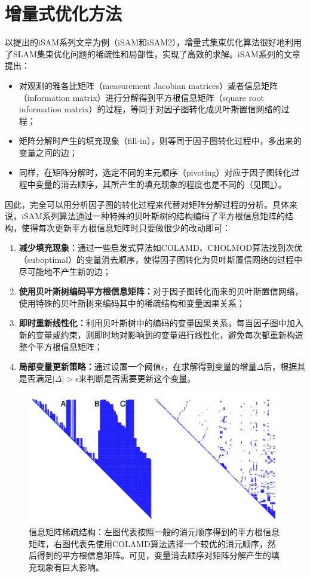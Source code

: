 \section{增量式优化方法}

以\citeauthor{kaess2008isam}提出的iSAM系列文章为例（iSAM\citep{kaess2008isam}和iSAM2\citep{kaess2012isam2}），增量式集束优化算法很好地利用了SLAM集束优化问题的稀疏性和局部性，实现了高效的求解。iSAM系列的文章提出：
\begin{itemize}
    \item 对观测的雅各比矩阵（measurement Jacobian matrices）或者信息矩阵（information matrix）进行分解得到平方根信息矩阵（square root information matrix）的过程，等同于对因子图转化成贝叶斯置信网络的过程；
    \item 矩阵分解时产生的填充现象（fill-in），则等同于因子图转化过程中，多出来的变量之间的边；
    \item 同样，在矩阵分解时，选定不同的主元顺序（pivoting）对应于因子图转化过程中变量的消去顺序，其所产生的填充现象的程度也是不同的（见图\ref{fig:fill_in}）。
\end{itemize}

因此，完全可以用分析因子图的转化过程来代替对矩阵分解过程的分析。具体来说，iSAM系列算法通过一种特殊的贝叶斯树的结构编码了平方根信息矩阵的结构，使得每次更新平方根信息矩阵时只要做很少的改动即可：
\begin{enumerate}
    \item \textbf{减少填充现象：}通过一些启发式算法如COLAMD\citep{davis2004algorithm}、CHOLMOD\citep{chen2008algorithm}算法找到次优（suboptimal）的变量消去顺序，使得因子图转化为贝叶斯置信网络的过程中尽可能地不产生新的边；
    \item \textbf{使用贝叶斯树编码平方根信息矩阵：}对于因子图转化而来的贝叶斯置信网络，使用特殊的贝叶斯树来编码其中的稀疏结构和变量因果关系；
    \item \textbf{即时重新线性化：}利用贝叶斯树中的编码的变量因果关系，每当因子图中加入新的变量或约束，则即时地对影响到的变量进行线性化，避免每次都重新构造整个平方根信息矩阵；
    \item \textbf{局部变量更新策略：}通过设置一个阈值$\epsilon$，在求解得到变量的增量$\Delta$后，根据其是否满足$|\Delta|>\epsilon$来判断是否需要更新这个变量。
\end{enumerate}

\begin{figure}[htb!]
    \centering
    \includegraphics[width=.8\textwidth]{./figs/sparse_pattern.png}
    \caption{信息矩阵稀疏结构\citep{kaess2008isam}：左图代表按照一般的消元顺序得到的平方根信息矩阵，右图代表先使用COLAMD算法选择一个较优的消元顺序，然后得到的平方根信息矩阵。可见，变量消去顺序对矩阵分解产生的填充现象有巨大影响。}
    \label{fig:fill_in}
\end{figure}
